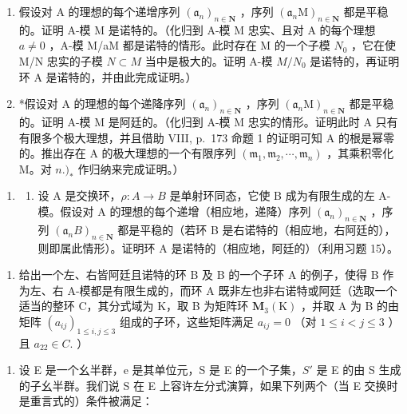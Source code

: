 \begin{enumerate}
\def\labelenumi{\alph{enumi})}
\item
  假设对 A 的理想的每个递增序列 \((\mathfrak{a}_{n})_{n\in\mathbf{N}}\) ，序列 \((\mathfrak{a}_{n}\mathrm{M})_{n\in\mathbf{N}}\) 都是平稳的。证明 A-模 M 是诺特的。（化归到 A-模 M 忠实、且对 A 的每个理想 \(a\neq0\) ，A-模 M/aM 都是诺特的情形。此时存在 M 的一个子模 \(N_{0}\) ，它在使 M/N 忠实的子模 \(N\subset M\) 当中是极大的。证明 A-模 \(M/N_{0}\) 是诺特的，再证明环 A 是诺特的，并由此完成证明。）
\item
  *假设对 A 的理想的每个递降序列 \((\mathfrak{a}_n)_{n \in \mathbf{N}}\) ，序列 \((\mathfrak{a}_n\mathrm{M})_{n \in \mathbf{N}}\) 都是平稳的。证明 A-模 M 是阿廷的。（化归到 A-模 M 忠实的情形。证明此时 A 只有有限多个极大理想，并且借助 VIII, p.~173 命题 1 的证明可知 A 的根是幂零的。推出存在 A 的极大理想的一个有限序列 \((\mathfrak{m}_{1}, \mathfrak{m}_{2}, \cdots, \mathfrak{m}_{n})\) ，其乘积零化 M。对 \(n.)_{*}\) 作归纳来完成证明。）
\end{enumerate}

\begin{enumerate}
\def\labelenumi{\arabic{enumi})}
\setcounter{enumi}{15}
\tightlist
\item
  \begin{enumerate}
  \def\labelenumii{\alph{enumii})}
  \tightlist
  \item
    设 A 是交换环，\(\rho: A \to B\) 是单射环同态，它使 B 成为有限生成的左 A-模。假设对 A 的理想的每个递增（相应地，递降）序列 \((\mathfrak{a}_{n})_{n \in \mathbf{N}}\) ，序列 \((\mathfrak{a}_{n}B)_{n \in \mathbf{N}}\) 都是平稳的（若环 B 是右诺特的（相应地，右阿廷的），则即属此情形）。证明环 A 是诺特的（相应地，阿廷的）（利用习题 15）。
  \end{enumerate}
\end{enumerate}

\begin{enumerate}
\def\labelenumi{\alph{enumi})}
\setcounter{enumi}{1}
\tightlist
\item
  给出一个左、右皆阿廷且诺特的环 B 及 B 的一个子环 A 的例子，使得 B 作为左、右 A-模都是有限生成的，而环 A 既非左也非右诺特或阿廷（选取一个适当的整环 C，其分式域为 K，取 B 为矩阵环 \(\mathbf{M}_{3}(\mathrm{K})\) ，并取 A 为 B 的由矩阵 \((a_{ij})_{1\leqslant i,j\leqslant3}\) 组成的子环，这些矩阵满足 \(a_{ij}=0\) （对 \(1\leqslant i<j\leqslant3\) ）且 \(a_{22}\in C.\) ）
\end{enumerate}

\begin{enumerate}
\def\labelenumi{\arabic{enumi})}
\setcounter{enumi}{16}
\tightlist
\item
  设 E 是一个幺半群，e 是其单位元，S 是 E 的一个子集，\(S'\) 是 E 的由 S 生成的子幺半群。我们说 S 在 E 上容许左分式演算，如果下列两个（当 E 交换时是重言式的）条件被满足：
\end{enumerate}

